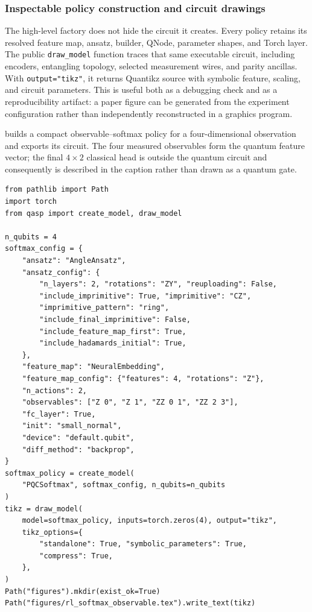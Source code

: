 \documentclass[10pt]{article}
\newcommand{\code}[1]{\texttt{#1}}
\begin{document}
\subsubsection{Inspectable policy construction and circuit drawings}
\label{sec:rl-drawings}

The high-level factory does not hide the circuit it creates.  Every policy retains its resolved feature map, ansatz, builder, QNode, parameter shapes, and Torch layer.  The public \code{draw\_model} function traces that same executable circuit, including encoders, entangling topology, selected measurement wires, and parity ancillas.  With \code{output="tikz"}, it returns Quantikz source with symbolic feature, scaling, and circuit parameters.  This is useful both as a debugging check and as a reproducibility artifact: a paper figure can be generated from the experiment configuration rather than independently reconstructed in a graphics program.

 builds a compact observable--softmax policy for a four-dimensional observation and exports its circuit.  The four measured observables form the quantum feature vector; the final $4\times2$ classical head is outside the quantum circuit and consequently is described in the caption rather than drawn as a quantum gate.

\begin{lstlisting}[caption={Constructing and drawing an observable--softmax RL policy.  The saved circuit is shown in \cref{fig:rl-softmax-circuit}.},label={lst:draw-softmax}]
from pathlib import Path
import torch
from qasp import create_model, draw_model

n_qubits = 4
softmax_config = {
    "ansatz": "AngleAnsatz",
    "ansatz_config": {
        "n_layers": 2, "rotations": "ZY", "reuploading": False,
        "include_imprimitive": True, "imprimitive": "CZ",
        "imprimitive_pattern": "ring",
        "include_final_imprimitive": False,
        "include_feature_map_first": True,
        "include_hadamards_initial": True,
    },
    "feature_map": "NeuralEmbedding",
    "feature_map_config": {"features": 4, "rotations": "Z"},
    "n_actions": 2,
    "observables": ["Z 0", "Z 1", "ZZ 0 1", "ZZ 2 3"],
    "fc_layer": True,
    "init": "small_normal",
    "device": "default.qubit",
    "diff_method": "backprop",
}
softmax_policy = create_model(
    "PQCSoftmax", softmax_config, n_qubits=n_qubits
)
tikz = draw_model(
    model=softmax_policy, inputs=torch.zeros(4), output="tikz",
    tikz_options={
        "standalone": True, "symbolic_parameters": True,
        "compress": True,
    },
)
Path("figures").mkdir(exist_ok=True)
Path("figures/rl_softmax_observable.tex").write_text(tikz)
\end{lstlisting}
\end{document}
